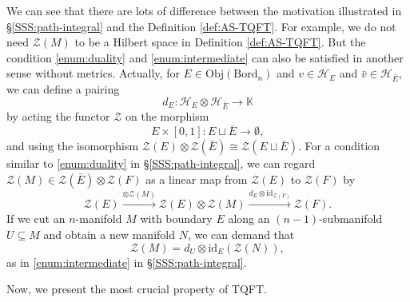 \documentclass[10pt,reqno,final]{article}
\numberwithin{equation}{section}
\numberwithin{figure}{section}
\numberwithin{table}{section}
\theoremstyle{plain}
\theoremstyle{definition}
\theoremstyle{remark}
\begin{document}
    We can see that there are lots of difference between the motivation illustrated in \S\ref{SSS:path-integral} and the Definition \ref{def:AS-TQFT}. For example, we do not need \(\mathcal{Z}(M)\) to be a Hilbert space in Definition \ref{def:AS-TQFT}. But the condition \ref{enum:duality} and \ref{enum:intermediate} can also be satisfied in another sense without metrics. Actually, for \(E\in \mathrm{Obj}(\mathrm{Bord}_{n})\) and \(v\in \mathcal{H}_{E}\) and \(\bar{v}\in \mathcal{H}_{\bar{E}}\), we can define a pairing 
    \begin{equation}
      d_{E }:\mathcal{H}_{E }\otimes \mathcal{H}_{\bar{E}}\to \mathbb{K}
    \end{equation}
    by acting the functor \(\mathcal{Z}\) on the morphism 
    \[
        E\times [0,1]:E\sqcup \bar{E}\to \emptyset,
    \]
    and using the isomorphism \(\mathcal{Z}(E)\otimes \mathcal{Z}(\bar{E} )\cong \mathcal{Z}(E\sqcup \bar{E})\). For a condition similar to \ref{enum:duality} in \S \ref{SSS:path-integral}, we can regard \(\mathcal{Z}(M)\in \mathcal{Z}(\bar{E})\otimes \mathcal{Z}(F)\) as a linear map from \(\mathcal{Z}(E)\) to \(\mathcal{Z}(F)\) by 
    \begin{equation}
      \mathcal{Z}(E)\xrightarrow{\otimes \mathcal{Z}(M)}\mathcal{Z}(E )\otimes \mathcal{Z}(M)\xrightarrow{d_{E}\otimes \mathrm{id}_{\mathcal{Z}(F)}}\mathcal{Z}(F).
    \end{equation}
    If we cut an \(n\)-manifold \(M\) with boundary \(E\) along an \((n-1)\)-submanifold \(U \subseteq M \) and obtain a new manifold \(N\), we can demand that 
    \begin{equation}
      \mathcal{Z}(M)=d_{U}\otimes \mathrm{id}_{E}(\mathcal{Z}(N)),
    \end{equation}
    as in \ref{enum:intermediate} in \S \ref{SSS:path-integral}. 

    Now, we present the most crucial property of TQFT.
\end{document}
